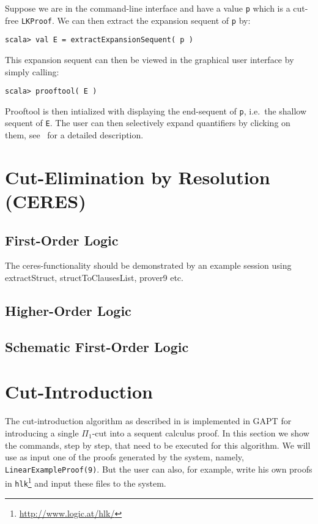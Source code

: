 \documentclass[a4paper,11pt]{article}
\newcommand{\cli}[1]{{\tt {#1}}}
\newenvironment{meta}{\color{red}}{\color{black}}
\begin{document}
Suppose we are in the command-line interface and have a value \cli{p} which is a cut-free \cli{LKProof}.
We can then extract the expansion sequent of \cli{p} by:
\begin{lstlisting}
scala> val E = extractExpansionSequent( p )
\end{lstlisting}
This expansion sequent can then be viewed in the graphical user interface by simply calling:
\begin{lstlisting}
scala> prooftool( E )
\end{lstlisting}
Prooftool is then intialized with displaying the end-sequent of \cli{p}, i.e.\ the shallow sequent
of \cli{E}. The user can then selectively expand quantifiers by clicking on them, see~\cite{Hetzl13Understanding}
for a detailed description.


\section{Cut-Elimination by Resolution (CERES)}


\subsection{First-Order Logic}

\begin{meta}
The ceres-functionality should be demonstrated by an example
session using extractStruct, structToClausesList, prover9 etc.
\end{meta}


\subsection{Higher-Order Logic}


\subsection{Schematic First-Order Logic}


\section{Cut-Introduction}

The cut-introduction algorithm as described in \cite{HetzlXXAlgorithmic} is
implemented in GAPT for introducing a single $\Pi_1$-cut into a sequent calculus
proof. In this section we show the commands, step by step, that need to be
executed for this algorithm. We will use as input one of the proofs generated by
the system, namely, \texttt{LinearExampleProof(9)}. But the
user can also, for example, write his own proofs in
\texttt{hlk}\footnote{\url{http://www.logic.at/hlk/}} and input these files to
the system. 
\end{document}

